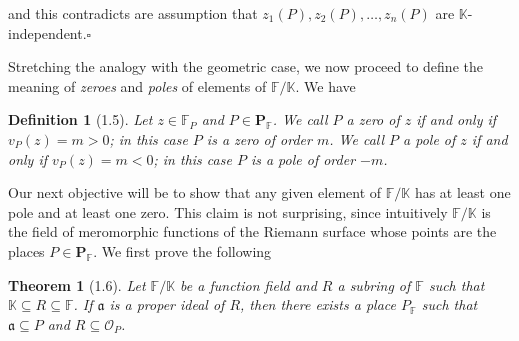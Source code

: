 \documentclass[11pt]{article}
\theoremstyle{scplain}
\newtheorem*{theorem}{Theorem}
\newtheorem*{definition}{Definition}
\begin{document}
\noindent
and this contradicts are assumption that $z_1(P), z_2(P), \ldots, z_n(P)$ are
$\mathbb{K}$-independent.\hfill$\square$

\medskip
Stretching the analogy with the geometric case, we now proceed to define the
meaning of \emph{zeroes} and \emph{poles} of elements of $\mathbb{F}/\mathbb{K}$.
We have

\begin{definition}[1.5]
Let $z \in \mathbb{F}_P$ and $P \in \mathbf{P}_{\mathbb{F}}$. We call $P$ a zero of
$z$ if and only if $v_P(z) = m > 0$; in this case $P$ is a zero of order $m$. We
call $P$ a pole of $z$ if and only if $v_P(z) = m < 0$; in this case $P$ is a pole
of order $-m$.
\end{definition}

Our next objective will be to show that any given element of $\mathbb{F}/\mathbb{K}$
has at least one pole and at least one zero. This claim is not surprising, since
intuitively $\mathbb{F}/\mathbb{K}$ is the field of meromorphic functions of the
Riemann surface whose points are the places $P \in \mathbf{P}_{\mathbb{F}}$. We
first prove the following

\begin{theorem}[1.6]
Let $\mathbb{F}/\mathbb{K}$ be a function field and $R$ a subring of $\mathbb{F}$
such that $\mathbb{K} \subseteq R \subseteq \mathbb{F}$. If $\mathfrak{a}$ is a
proper ideal of $R$, then there exists a place $P_{\mathbb{F}}$ such that
$\mathfrak{a} \subseteq P$ and $R \subseteq \mathcal{O}_P$.
\end{theorem}
\end{document}
